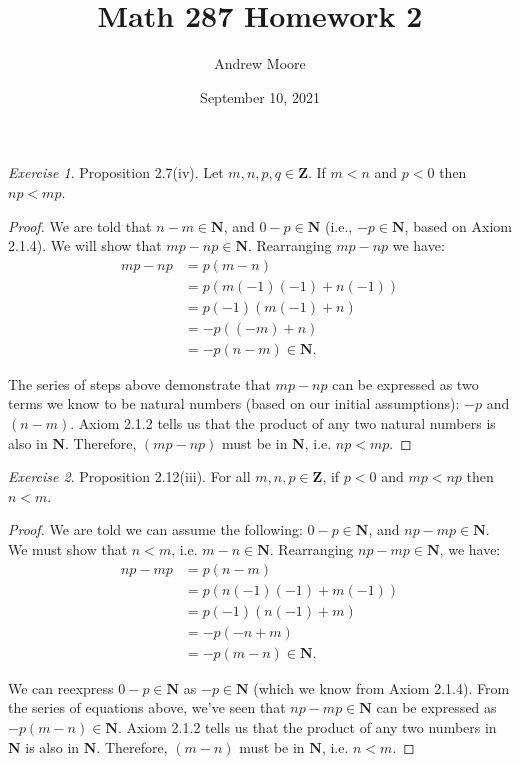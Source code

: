\documentclass[12pt,oneside]{amsart}
\title{Math 287 Homework 2}
\author{Andrew Moore}
\date{September 10, 2021} %
\theoremstyle{remark}
\newtheorem{exer}{Exercise}
\newcommand{\bfN}{\mathbf{N}}
\newcommand{\bfZ}{\mathbf{Z}}
\begin{document}
\maketitle

\newpage
\begin{exer}
Proposition 2.7(iv). Let $m,n,p,q \in \bfZ$.
If $m < n$ and $p < 0$ then $np < mp$.
\end{exer}

\begin{proof}
We are told that $n - m \in \bfN$, and $0 - p \in \bfN$ (i.e., $-p \in \bfN$, based on Axiom 2.1.4). We will show that $mp - np \in \bfN$. Rearranging $mp - np$ we have:
\begin{align*}
mp - np &= p(m - n) \\
        &= p(m(-1)(-1) + n(-1)) \\
        &= p(-1)(m(-1) + n) \\
        &= -p((-m) + n) \\
        &= -p(n - m) \in \bfN.
\end{align*}

The series of steps above demonstrate that $mp - np$ can be expressed as two terms we know to be natural numbers (based on our initial assumptions): $-p$ and $(n - m)$. Axiom 2.1.2 tells us that the product of any two natural numbers is also in $\bfN$. Therefore, $(mp - np)$ must be in $\bfN$, i.e. $np < mp$.
\end{proof}

\newpage
\begin{exer}
Proposition 2.12(iii). For all $m,n,p \in \bfZ$,
if $p < 0$ and $mp < np$ then $n < m$.
\end{exer}

\begin{proof}
We are told we can assume the following: $0 - p \in \bfN$, and $np - mp \in \bfN$. We must show that $n < m$, i.e. $m - n \in \bfN$. Rearranging $np - mp \in \bfN$, we have:
\begin{align*}
np - mp &= p(n - m) \\
        &= p(n(-1)(-1) + m(-1)) \\
        &= p(-1)(n(-1) + m) \\
        &= -p(-n + m) \\
        &= -p(m - n) \in \bfN.
\end{align*}

We can reexpress $0 - p \in \bfN$ as $-p \in \bfN$ (which we know from Axiom 2.1.4). From the series of equations above, we've seen that $np - mp \in \bfN$ can be expressed as $-p(m - n) \in \bfN$. Axiom 2.1.2 tells us that the product of any two numbers in $\bfN$ is also in $\bfN$. Therefore, $(m - n)$ must be in $\bfN$, i.e. $n < m$.

\end{proof}
\end{document}

